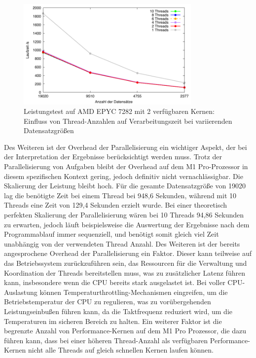 \begin{figure}[H]
\centering
\includegraphics[width=0.8\textwidth]{../results/plots/vps/comp_all_threads.pdf}
\caption{Leistungstest auf AMD EPYC 7282 mit 2 verfügbaren Kernen: Einfluss von Thread-Anzahlen auf Verarbeitungszeit bei variierenden Datensatzgrößen}
\label{fig:vps_benchmark_threads}
\end{figure}

Des Weiteren ist der Overhead der Parallelisierung ein wichtiger Aspekt, der bei der Interpretation der Ergebnisse berücksichtigt werden muss. Trotz der Parallelisierung von Aufgaben bleibt der Overhead auf dem M1 Pro-Prozessor in diesem spezifischen Kontext gering, jedoch definitiv nicht vernachlässigbar. Die Skalierung der Leistung bleibt hoch. Für die gesamte Datensatzgröße von 19020 lag die benötigte Zeit bei einem Thread bei 948,6 Sekunden, während mit 10 Threads eine Zeit von 129,4 Sekunden erzielt wurde. Bei einer theoretisch perfekten Skalierung der Parallelisierung wären bei 10 Threads 94,86 Sekunden zu erwarten, jedoch läuft beispielsweise die Auswertung der Ergebnisse nach dem Programmablauf immer sequenziell, und benötigt somit gleich viel Zeit unabhängig von der verwendeten Thread Anzahl. Des Weiteren ist der bereits angesprochene Overhead der Parallelisierung ein Faktor. Dieser kann teilweise auf das Betriebssystem zurückzuführen sein, das Ressourcen für die Verwaltung und Koordination der Threads bereitstellen muss, was zu zusätzlicher Latenz führen kann, insbesondere wenn die CPU bereits stark ausgelastet ist. Bei voller CPU-Auslastung können Temperaturthrottling-Mechanismen eingreifen, um die Betriebstemperatur der CPU zu regulieren, was zu vorübergehenden Leistungseinbußen führen kann, da die Taktfrequenz reduziert wird, um die Temperaturen im sicheren Bereich zu halten. Ein weiterer Faktor ist die begrenzte Anzahl von Performance-Kernen auf dem M1 Pro Prozessor, die dazu führen kann, dass bei einer höheren Thread-Anzahl als verfügbaren Performance-Kernen nicht alle Threads auf gleich schnellen Kernen laufen können.

